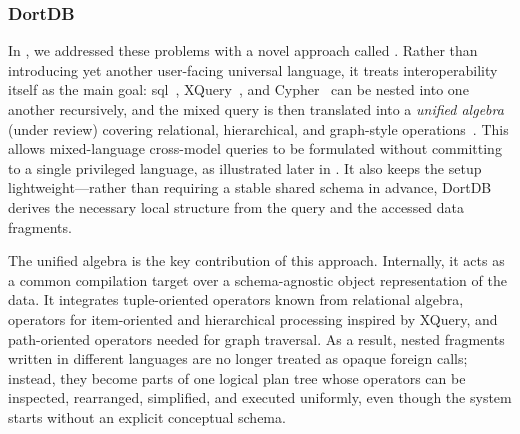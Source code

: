
\subsubsection{DortDB}

In , we addressed these problems with a novel approach called . Rather than introducing yet another user-facing universal language, it treats interoperability itself as the main goal: \acrshort{sql}~\citep{SQL}, XQuery~\citep{XQuery}, and Cypher~\citep{Cypher} can be nested into one another recursively, and the mixed query is then translated into a \emph{unified algebra}~\citep{jezek_2026} (under review) covering relational, hierarchical, and graph-style operations~\citep{DBLP:conf/icde/ReSF06,DBLP:conf/edbt/AnglesBGV25,DBLP:conf/sigmod/HolschGS16}. This allows mixed-language cross-model queries to be formulated without committing to a single privileged language, as illustrated later in . It also keeps the setup lightweight---rather than requiring a stable shared schema in advance, DortDB derives the necessary local structure from the query and the accessed data fragments.

The unified algebra is the key contribution of this approach. Internally, it acts as a common compilation target over a schema-agnostic object representation of the data. It integrates tuple-oriented operators known from relational algebra, operators for item-oriented and hierarchical processing inspired by XQuery, and path-oriented operators needed for graph traversal. As a result, nested fragments written in different languages are no longer treated as opaque foreign calls; instead, they become parts of one logical plan tree whose operators can be inspected, rearranged, simplified, and executed uniformly, even though the system starts without an explicit conceptual schema.

